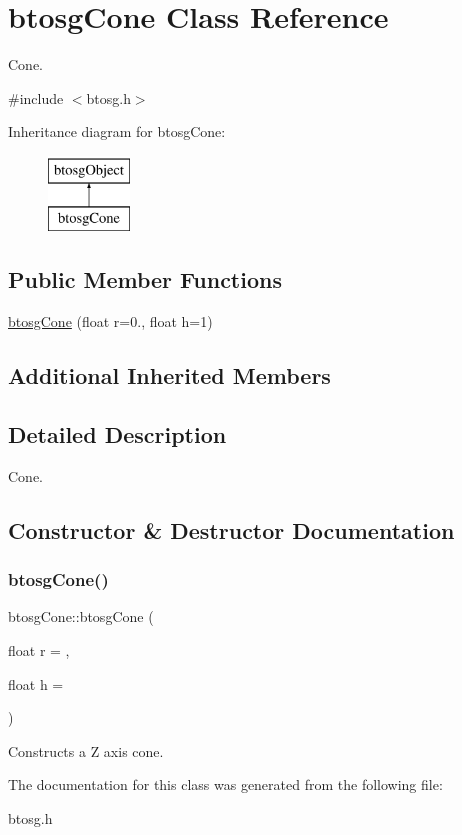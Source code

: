 \hypertarget{classbtosgCone}{}\section{btosg\+Cone Class Reference}
\label{classbtosgCone}


Cone.  




{\ttfamily \#include $<$btosg.\+h$>$}

Inheritance diagram for btosg\+Cone\+:\begin{figure}[H]
\begin{center}
\leavevmode
\includegraphics[height=2.000000cm]{classbtosgCone}
\end{center}
\end{figure}
\subsection*{Public Member Functions}
\begin{DoxyCompactItemize}
\item 
\hyperlink{classbtosgCone_a119bf79e2311ba084939d3e25086751c}{btosg\+Cone} (float r=0., float h=1)
\end{DoxyCompactItemize}
\subsection*{Additional Inherited Members}


\subsection{Detailed Description}
Cone. 

\subsection{Constructor \& Destructor Documentation}
\mbox{\label{classbtosgCone_a119bf79e2311ba084939d3e25086751c}} 
\subsubsection{\texorpdfstring{btosg\+Cone()}{btosgCone()}}
{\footnotesize\ttfamily btosg\+Cone\+::btosg\+Cone (\begin{DoxyParamCaption}\item[{float}]{r = {},  }\item[{float}]{h = {} }\end{DoxyParamCaption})\hspace{0.3cm}{\ttfamily [inline]}}

Constructs a Z axis cone. 

The documentation for this class was generated from the following file\+:\begin{DoxyCompactItemize}
\item 
btosg.\+h\end{DoxyCompactItemize}
